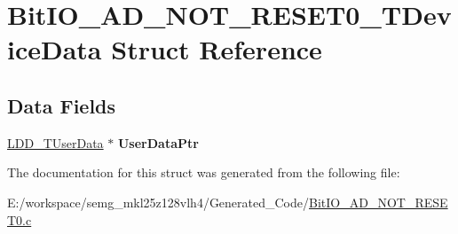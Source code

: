 \hypertarget{struct_bit_i_o___a_d___n_o_t___r_e_s_e_t0___t_device_data}{\section{Bit\-I\-O\-\_\-\-A\-D\-\_\-\-N\-O\-T\-\_\-\-R\-E\-S\-E\-T0\-\_\-\-T\-Device\-Data Struct Reference}
\label{struct_bit_i_o___a_d___n_o_t___r_e_s_e_t0___t_device_data}
}
\subsection*{Data Fields}
\begin{DoxyCompactItemize}
\item 
\hypertarget{struct_bit_i_o___a_d___n_o_t___r_e_s_e_t0___t_device_data_a3fad2f6744387a19f7d4b0716e6b1fd3}{\hyperlink{group___p_e___types__module_ga0b66a73f87238a782318aa0be7578e35}{L\-D\-D\-\_\-\-T\-User\-Data} $\ast$ {\bfseries User\-Data\-Ptr}}\label{struct_bit_i_o___a_d___n_o_t___r_e_s_e_t0___t_device_data_a3fad2f6744387a19f7d4b0716e6b1fd3}

\end{DoxyCompactItemize}


The documentation for this struct was generated from the following file\-:\begin{DoxyCompactItemize}
\item 
E\-:/workspace/semg\-\_\-mkl25z128vlh4/\-Generated\-\_\-\-Code/\hyperlink{_bit_i_o___a_d___n_o_t___r_e_s_e_t0_8c}{Bit\-I\-O\-\_\-\-A\-D\-\_\-\-N\-O\-T\-\_\-\-R\-E\-S\-E\-T0.\-c}\end{DoxyCompactItemize}
